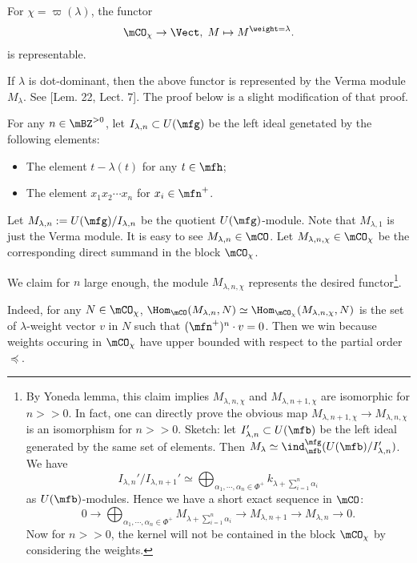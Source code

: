 	\begin{lem}
		\label{lem-weigth-reprentable}
		For $\chi = \varpi(\lambda)$, the functor
		\[
			\mCO_\chi \to \Vect,\; M \mapsto M^{\weight = \lambda}.
		\]
		is representable.
	\end{lem}

	\begin{rem}
		If $\lambda$ is dot-dominant, then the above functor is represented by the Verma module $M_\lambda$. See [Lem. 22, Lect. 7]. The proof below is a slight modification of that proof.
	\end{rem}

	\proof
		For any $n\in \mBZ^{>0}$, let $I_{\lambda,n}\subset U(\mfg)$ be the left ideal genetated by the following elements:
		\begin{itemize}
			\item The element $t-\lambda(t)$ for any $t\in \mfh$;
			\item The element $x_1x_2\cdots x_n$ for $x_i\in \mfn^+$.
		\end{itemize}
		Let $M_{\lambda,n}:=U(\mfg)/I_{\lambda,n}$ be the quotient $U(\mfg)$-module. Note that $M_{\lambda,1}$ is just the Verma module. It is easy to see $M_{\lambda,n}\in \mCO$. Let $M_{\lambda,n,\chi}\in \mCO_\chi$ be the corresponding direct summand in the block $\mCO_\chi$.

		We claim for $n$ large enough, the module $M_{\lambda,n,\chi}$ represents the desired functor\footnote{By Yoneda lemma, this claim implies $M_{\lambda,n,\chi}$ and $M_{\lambda,n+1,\chi}$ are isomorphic for $n>>0$. In fact, one can directly prove the obvious map $M_{\lambda,n+1,\chi} \to M_{\lambda,n,\chi}$ is an isomorphism for $n>>0$. Sketch: let $I_{\lambda,n}' \subset U(\mfb)$ be the left ideal generated by the same set of elements. Then $M_{\lambda}\simeq \ind_\mfb^\mfg( U(\mfb)/I_{\lambda,n}' )$. We have 
		\[
			I_{\lambda,n}'/I_{\lambda,n+1}' \simeq \bigoplus_{\alpha_1,\cdots,\alpha_n\in \Phi^+} k_{\lambda+\sum_{i=1}^n \alpha_i}
		\]
		as $U(\mfb)$-modules. Hence we have a short exact sequence in $\mCO$:
		\[
			0 \to \bigoplus_{\alpha_1,\cdots,\alpha_n\in \Phi^+} M_{\lambda+\sum_{i=1}^n \alpha_i} \to M_{\lambda,n+1} \to M_{\lambda,n} \to 0.
		\]
		Now for $n>>0$, the kernel will not be contained in the block $\mCO_\chi$ by considering the weights.
		}. 

		Indeed, for any $N\in \mCO_\chi$, $\Hom_{\mCO}(M_{\lambda,n},N) \simeq \Hom_{\mCO_\chi}(M_{\lambda,n,\chi},N)$ is the set of $\lambda$-weight vector $v$ in $N$ such that $(\mfn^+)^n\cdot v = 0$. Then we win because weights occuring in $ \mCO_\chi$ have upper bounded with respect to the partial order $\preceq$.


